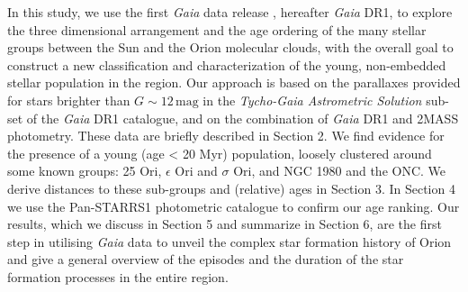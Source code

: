 \documentclass[onecolumn]{aa} %
\begin{document}
In this study, we use the first \textit{Gaia} data release \citep{Brown2016, Prusti2016}, hereafter \textit{Gaia} DR1, to explore the three dimensional arrangement and the age ordering of the many stellar groups between the Sun and the Orion molecular clouds,
with the overall goal to construct a new classification and characterization of the young, non-embedded stellar population in the region.  
Our approach is based on the parallaxes provided for stars brighter than $G \sim 12 \, \mathrm{mag}$ in the \textit{Tycho-Gaia Astrometric Solution} \citep[TGAS][]{Michalik2015, Lindegren2016} sub-set of the \textit{Gaia} DR1 catalogue, and on the combination of \textit{Gaia} DR1 and 2MASS photometry. These data are briefly described in Section 2. 
We find evidence for the presence of a young (age < 20 Myr) population, loosely clustered around some known groups: 25 Ori, $\epsilon$ Ori and $\sigma$ Ori, and NGC 1980 and the ONC. We derive distances to these sub-groups and (relative) ages in Section 3. In Section 4 we use the Pan-STARRS1 photometric catalogue \citep{Chambers2016}  to confirm our age ranking. 
Our results, which we discuss in Section 5 and summarize in Section 6, are the first step in utilising \textit{Gaia} data to unveil the complex star formation history of Orion and give a general overview of the episodes and the duration of the star formation processes in the entire region.
\end{document}
